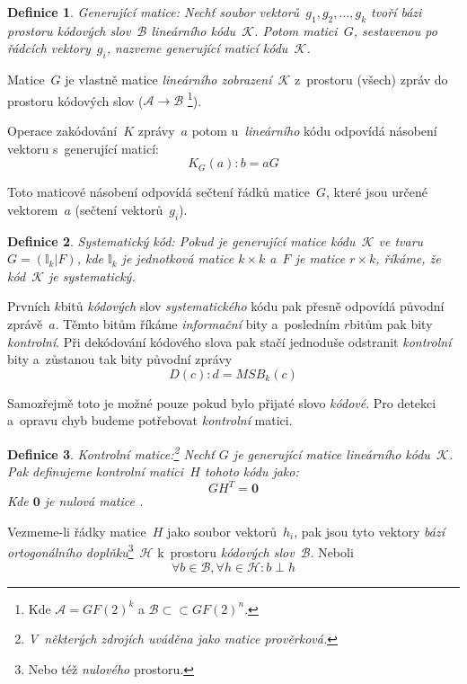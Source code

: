 \documentclass[thesis=M,czech,hidelinks]{FITthesis}[2012/06/26]
\newcommand{\0}{{\textcolor[gray]{0.75}{0}}}
\newtheorem{definice}{Definice}
\begin{document}
\begin{definice}{Generující matice:}
    Nechť soubor vektorů~$g_1,g_2,\ldots,g_k$ tvoří bázi prostoru
    kódových slov~$\mathcal{B}$ \emph{lineárního kódu}~$\mathcal{K}$. Potom
    matici~$G$, sestavenou po řádcích vektory~$g_i$, nazveme \emph{generující
    maticí} kódu~$\mathcal{K}$.
\end{definice}

Matice~$G$ je vlastně matice \emph{lineárního zobrazení}~$\mathcal{K}$
z~prostoru (všech) zpráv do prostoru kódových slov
($\mathcal{A} \to \mathcal{B}$ \footnote{
    Kde $\mathcal{A} = GF(2)^k$ a $\mathcal{B} \subset \subset GF(2)^n$.
}).

Operace zakódování~$K$ zprávy~$a$ potom u~\emph{lineárního} kódu odpovídá
násobení vektoru s~generující maticí:
$$ K_G(a) : b = aG $$

Toto maticové násobení odpovídá sečtení řádků matice~$G$, které jsou určené
vektorem~$a$ (sečtení vektorů~$g_i$).

\begin{definice}{Systematický kód:}
    Pokud je \emph{generující} matice kódu~$\mathcal{K}$ ve tvaru \\
    $G=(\mathbb{I}_k|F)$, kde $\mathbb{I}_k$ je jednotková matice $k \times k$
    a~$F$ je matice $r \times k$, říkáme, že kód~$\mathcal{K}$ je
    \emph{systematický}.
\end{definice}

Prvních $k$\;bitů \emph{kódových} slov \emph{systematického} kódu pak přesně
odpovídá původní zprávě~$a$. Těmto bitům říkáme \emph{informační} bity
a~posledním $r$\;bitům pak bity \emph{kontrolní}. Při dekódování kódového slova
pak stačí jednoduše odstranit \emph{kontrolní} bity a~zůstanou tak bity původní
zprávy
$$ D(c) : d = MSB_k(c) $$

Samozřejmě toto je možné pouze pokud bylo přijaté slovo \emph{kódové}. Pro
detekci a~opravu chyb budeme potřebovat \emph{kontrolní} matici.

\begin{definice}{Kontrolní matice:}\footnote{
    V~některých zdrojích uváděna jako matice \emph{prověrková}.
}
    Nechť $G$ je \emph{generující} matice \emph{lineárního kódu}~$\mathcal{K}$.
    Pak definujeme \emph{kontrolní matici}~$H$ tohoto kódu jako:
    $$ G H^T = \textbf{0} $$
    Kde $\textbf{0}$ je \emph{nulová matice} .
\end{definice}


Vezmeme-li řádky matice~$H$ jako soubor vektorů~$h_i$, pak jsou tyto vektory
\emph{bází} \emph{ortogonálního doplňku}\footnote{
    Nebo též \emph{nulového} prostoru.
}~$\mathcal{H}$ k~prostoru \emph{kódových slov}~$\mathcal{B}$. Neboli
$$ \forall b \in \mathcal{B}, \forall h \in \mathcal{H} : b \perp h $$
\end{document}
